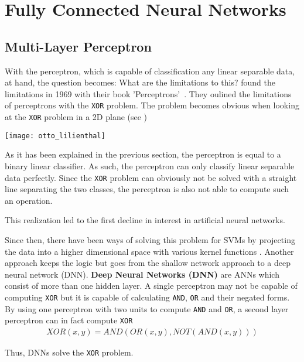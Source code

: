 \section{Fully Connected Neural Networks}
\subsection{Multi-Layer Perceptron}
With the perceptron, which is capable of classification any linear separable data, at hand, the question becomes: What are the limitations to this?
\citeauthor{perceptrons} found the limitations in 1969 with their book 'Perceptrons'~\cite{perceptrons}.
They oulined the limitations of perceptrons with the \lstinline|XOR| problem.
The problem becomes obvious when looking at the \lstinline|XOR| problem in a 2D plane (see )
\begin{marginfigure}
    \texttt{[image: otto\_lilienthal]}
    \caption[]{\lstinline|OR| and \lstinline|XOR| operations visualized. The \lstinline|XOR| problem cannot be solved by drawing a single line.}
\end{marginfigure}

As it has been explained in the previous section, the perceptron is equal to a binary linear classifier.
As such, the perceptron can only classify linear separable data perfectly.
Since the \lstinline|XOR| problem can obviously not be solved with a straight line separating the two classes, the perceptron is also not able to compute such an operation. 

This realization led to the first decline in interest in artificial neural networks.

Since then, there have been ways of solving this problem for SVMs by projecting the data into a higher dimensional space with various kernel functions \cite{ommer}.
Another approach keeps the logic but goes from the shallow network approach to a deep neural network (DNN).
\textbf{Deep Neural Networks (DNN)} are ANNs which consist of more than one hidden layer.
A single perceptron may not be capable of computing \lstinline|XOR| but it is capable of calculating \lstinline|AND|, \lstinline|OR| and their negated forms.
By using one perceptron with two units to compute \lstinline|AND| and \lstinline|OR|, a second layer perceptron can in fact compute \lstinline|XOR|
\begin{align}
    XOR(x, y) = AND(OR(x, y), NOT(AND(x, y)))
\end{align}

Thus, DNNs solve the \lstinline|XOR| problem.

